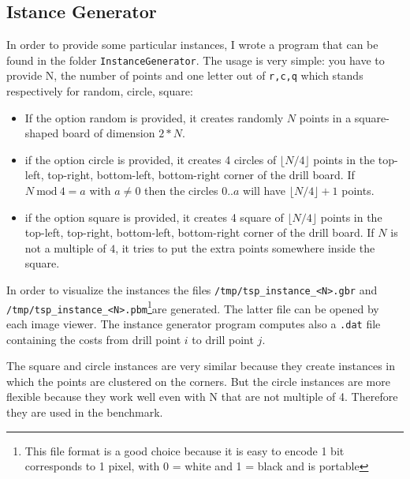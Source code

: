 \subsection{Istance Generator}

In order to provide some particular instances, I wrote a program that can be found in the folder
\verb|InstanceGenerator|. The usage is very simple: you have to provide N, the number of points and
one letter out of \verb|r,c,q| which stands respectively for random, circle, square:
\begin{itemize}
	\item If the option random is provided, it creates randomly $N$ points in a square-shaped board of dimension $2*N$.
	\item if the option circle is provided, it creates 4 circles of $\lfloor{N/4}\rfloor$ points in the top-left, top-right, bottom-left, bottom-right corner
	of the drill board. If $N\ \text{mod} \ 4 = a$ with $a \neq 0$ then the circles $0..a$ will have $\lfloor{N/4}\rfloor + 1$ points.
	\item if the option square is provided, it creates 4 square of $\lfloor{N/4}\rfloor$ points in the top-left, top-right, bottom-left,
	bottom-right corner of the drill board. If $N$ is not a multiple of $4$, it tries to put the extra points somewhere inside the square.
\end{itemize}
In order to visualize the instances the files
\verb!/tmp/tsp_instance_<N>.gbr! and \verb!/tmp/tsp_instance_<N>.pbm!\footnote{This file format is a good choice because it is easy to encode 1 bit corresponds to 1 pixel, with 0 = white and 1 = black and is portable}are generated.
The latter file can be opened by each image viewer.
The instance generator program computes also a \verb|.dat| file containing the costs from drill point $i$ to drill point $j$.

The square and circle instances are very similar because they create instances in which the points are clustered on the corners.
But the circle instances are more flexible because they work well even with N that are not multiple of 4. Therefore they are used in the benchmark.